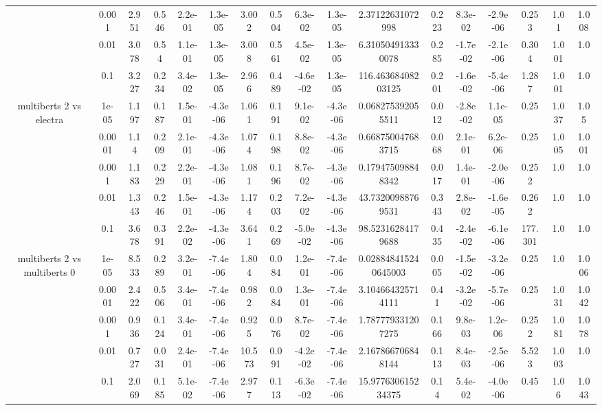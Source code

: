 \begin{tabular}{|c|c|c|c|c|c|c|c|c|c|c|c|c|c|c|c|c|}
 & 0.001 & 2.951 & 0.546 & 2.2e-01 & 1.3e-05 & 3.002 & 0.504 & 6.3e-02 & 1.3e-05 & 2.37122631072998 & 0.223 & 8.3e-02 & -2.9e-06 & 0.253 & 1.01 & 1.008 \\
 & 0.01 & 3.078 & 0.54 & 1.1e-01 & 1.3e-05 & 3.008 & 0.561 & 4.5e-02 & 1.3e-05 & 6.310504913330078 & 0.285 & -1.7e-02 & -2.1e-06 & 0.304 & 1.001 & 1.0 \\
 & 0.1 & 3.227 & 0.234 & 3.4e-02 & 1.3e-05 & 2.966 & 0.489 & -4.6e-02 & 1.3e-05 & 116.46368408203125 & 0.201 & -1.6e-02 & -5.4e-06 & 1.287 & 1.001 & 1.0 \\
\hline
\multirow{5}{*}{multiberts 2 vs electra } & 1e-05 & 1.197 & 0.187 & 1.5e-01 & -4.3e-06 & 1.061 & 0.191 & 9.1e-02 & -4.3e-06 & 0.068275392055511 & 0.012 & -2.8e-02 & 1.1e-05 & 0.25 & 1.037 & 1.05 \\
 & 0.0001 & 1.14 & 0.209 & 2.1e-01 & -4.3e-06 & 1.074 & 0.198 & 8.8e-02 & -4.3e-06 & 0.668750047683715 & 0.068 & 2.1e-01 & 6.2e-06 & 0.25 & 1.005 & 1.001 \\
 & 0.001 & 1.183 & 0.229 & 2.2e-01 & -4.3e-06 & 1.081 & 0.196 & 8.7e-02 & -4.3e-06 & 0.179475098848342 & 0.017 & 1.4e-01 & -2.0e-06 & 0.252 & 1.0 & 1.0 \\
 & 0.01 & 1.343 & 0.246 & 1.5e-01 & -4.3e-06 & 1.174 & 0.203 & 7.2e-02 & -4.3e-06 & 43.73200988769531 & 0.343 & 2.8e-02 & -1.6e-05 & 0.262 & 1.0 & 1.0 \\
 & 0.1 & 3.678 & 0.391 & 2.2e-02 & -4.3e-06 & 3.641 & 0.269 & -5.0e-02 & -4.3e-06 & 98.52316284179688 & 0.435 & -2.4e-02 & -6.1e-06 & 177.301 & 1.0 & 1.0 \\
\hline
\multirow{5}{*}{multiberts 2 vs multiberts 0} & 1e-05 & 8.533 & 0.289 & 3.2e-01 & -7.4e-06 & 1.804 & 0.084 & 1.2e-01 & -7.4e-06 & 0.028848415240645003 & 0.005 & -1.5e-02 & -3.2e-06 & 0.25 & 1.0 & 1.006 \\
 & 0.0001 & 2.422 & 0.506 & 3.4e-01 & -7.4e-06 & 0.982 & 0.084 & 1.3e-01 & -7.4e-06 & 3.104664325714111 & 0.41 & -3.2e-02 & -5.7e-06 & 0.25 & 1.031 & 1.042 \\
 & 0.001 & 0.936 & 0.124 & 3.4e-01 & -7.4e-06 & 0.925 & 0.076 & 8.7e-02 & -7.4e-06 & 1.787779331207275 & 0.166 & 9.8e-03 & 1.2e-06 & 0.252 & 1.081 & 1.078 \\
 & 0.01 & 0.727 & 0.031 & 2.4e-01 & -7.4e-06 & 10.573 & 0.091 & -4.2e-02 & -7.4e-06 & 2.167866706848144 & 0.113 & 8.4e-03 & -2.5e-06 & 5.523 & 1.003 & 1.0 \\
 & 0.1 & 2.069 & 0.185 & 5.1e-02 & -7.4e-06 & 2.977 & 0.113 & -6.3e-02 & -7.4e-06 & 15.977630615234375 & 0.14 & 5.4e-02 & -4.0e-06 & 0.45 & 1.06 & 1.043 \\

\end{tabular}
